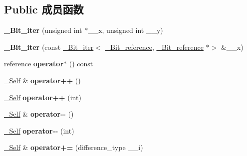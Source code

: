 \subsection*{Public 成员函数}
\begin{DoxyCompactItemize}
\item 
\mbox{\label{struct___bit__iter_af72223f5dbb42f11608e05c45a0e07bc}} 
{\bfseries \+\_\+\+Bit\+\_\+iter} (unsigned int $\ast$\+\_\+\+\_\+x, unsigned int \+\_\+\+\_\+y)
\item 
\mbox{\label{struct___bit__iter_a026b52376baeff7d5734374f2d349b89}} 
{\bfseries \+\_\+\+Bit\+\_\+iter} (const \hyperlink{struct___bit__iter}{\+\_\+\+Bit\+\_\+iter}$<$ \hyperlink{struct___bit__reference}{\+\_\+\+Bit\+\_\+reference}, \hyperlink{struct___bit__reference}{\+\_\+\+Bit\+\_\+reference} $\ast$$>$ \&\+\_\+\+\_\+x)
\item 
\mbox{\label{struct___bit__iter_a81c571723ff0574dc39e9e010629e0f9}} 
reference {\bfseries operator$\ast$} () const
\item 
\mbox{\label{struct___bit__iter_a9e725f610da794992cfedc89dd69b91d}} 
\hyperlink{struct___bit__iter}{\+\_\+\+Self} \& {\bfseries operator++} ()
\item 
\mbox{\label{struct___bit__iter_a2c1ab53c0833be04cf18fef6c6fe097d}} 
\hyperlink{struct___bit__iter}{\+\_\+\+Self} {\bfseries operator++} (int)
\item 
\mbox{\label{struct___bit__iter_a59a7e232a78acbc57f62b784e567dec4}} 
\hyperlink{struct___bit__iter}{\+\_\+\+Self} \& {\bfseries operator-\/-\/} ()
\item 
\mbox{\label{struct___bit__iter_a949661151c42bb9f0d367f5bba0003ee}} 
\hyperlink{struct___bit__iter}{\+\_\+\+Self} {\bfseries operator-\/-\/} (int)
\item 
\mbox{\label{struct___bit__iter_abf847ebd6967b87dd09f61bb96782e53}} 
\hyperlink{struct___bit__iter}{\+\_\+\+Self} \& {\bfseries operator+=} (difference\+\_\+type \+\_\+\+\_\+i)
\item 
\mbox{\label{struct___bit__iter_a705b4569e77014e935bcb6f9cf14bd10}} 
$$
\end{DoxyCompactItemize}
